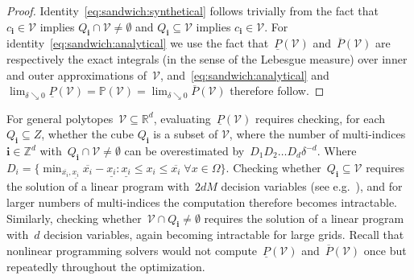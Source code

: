 \documentclass[letterpaper, 10pt, conference]{ieeeconf} %
\providecommand{\bfa}[1]{\mathbf{#1}}
\begin{document}
%
\begin{proof}
Identity~\eqref{eq:sandwich:synthetical} follows trivially from the fact that~$c_\bfa{i}\in\mathcal V$ implies $Q_\bfa{i}\cap\mathcal V\neq\emptyset$ and $Q_\bfa{i}\subseteq\mathcal V$ implies $c_\bfa{i}\in\mathcal V$.
%
For identity~\eqref{eq:sandwich:analytical} we use the fact that~$\underline P(\mathcal V)$ and~$\overline{P}(\mathcal V)$ are respectively the exact integrals (in the sense of the Lebesgue measure) over inner and outer approximations of~$\mathcal V$, and~\eqref{eq:sandwich:analytical} and~$\lim_{\delta\searrow0}\underline{P}(\mathcal V)=\mathbb{P}(\mathcal V)=\lim_{\delta\searrow0}\overline{P}(\mathcal V)$ therefore follow.
\end{proof}
%
For general polytopes~$\mathcal V\subseteq\mathbb R^d$, evaluating~$\underline{P}(\mathcal V)$ requires checking, for each $Q_{\bfa i} \subseteq Z$, whether the cube $Q_{\bfa i}$ is a subset of $\mathcal{V}$, where the number of multi-indices~$\bfa{i}\in\mathbb Z^d$ with~$Q_\bfa{i}\cap\mathcal V\neq\emptyset$ can be overestimated by~$D_1D_2\dots D_d \delta^{-d}$.
%
Where $D_i = \{\min_{\overline{x_i},\underline{x_i}} \overline{x_i}-\underline{x_i} : \underline{x_i}\leq x_i\leq\overline{x_i}\; \forall x\in\Omega\}$.
%
Checking whether~$Q_\bfa{i}\subseteq\mathcal V$ requires the solution of a linear program with~$2dM$ decision variables (see e.g.~\cite{Schaich:thesis}), and for larger numbers of multi-indices the computation therefore becomes intractable.
%
Similarly, checking whether~$\mathcal V\cap Q_\bfa{i}\neq\emptyset$ requires the solution of a linear program with~$d$ decision variables, again becoming intractable for large grids.
%
Recall that nonlinear programming solvers would not compute~$\underline{P}(\mathcal V)$ and~$\overline{P}(\mathcal V)$ once but repeatedly throughout the optimization.
%
\end{document}
